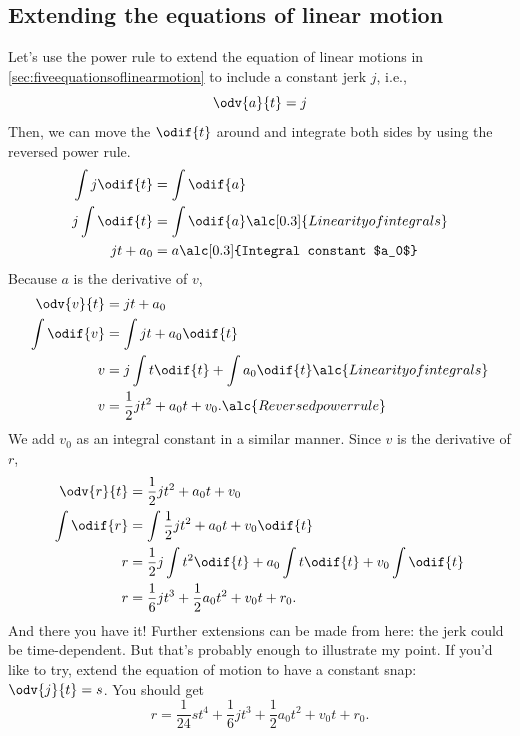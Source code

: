 \subsection{Extending the equations of linear motion}

Let's use the power rule to extend the equation of linear motions in \cref{sec:fiveequationsoflinearmotion} to include a constant jerk $j$, i.e.,
\begin{equation}
	\odv{a}{t} = j
\end{equation}
Then, we can move the $\odif{t}$ around and integrate both sides by using the reversed power rule.
\begin{align*}
	\int j\odif{t} & = \int\odif{a}                                   \\
	j\int \odif{t} & = \int\odif{a} \alc[0.3]{Linearity of integrals} \\
	jt + a_0       & = a \alc[0.3]{Integral constant $a_0$}
\end{align*}
Because $a$ is the derivative of $v$, 
\begin{align*}
	\odv{v}{t}    & = jt + a_0                                                        \\
	\int \odif{v} & = \int jt + a_0 \odif{t}                                          \\
	v             & = j\int t\odif{t} + \int a_0\odif{t} \alc{Linearity of integrals} \\
	v             & = \frac{1}{2}jt^2 + a_0t + v_0. \alc{Reversed power rule}
\end{align*}
We add $v_0$ as an integral constant in a similar manner. Since $v$ is the derivative of $r$,
\begin{align*}
	\odv{r}{t}    & = \frac{1}{2}jt^2 + a_0t + v_0                                       \\
	\int \odif{r} & = \int\frac{1}{2}jt^2 + a_0t + v_0 \odif{t}                          \\
	r             & = \frac{1}{2}j\int t^2\odif{t} + a_0\int t\odif{t} + v_0\int\odif{t} \\
	r             & = \frac{1}{6}jt^3 + \frac{1}{2}a_0t^2 + v_0t + r_0.
\end{align*}
And there you have it! Further extensions can be made from here: the jerk could be time-dependent. But that's probably enough to illustrate my point. If you'd like to try, extend the equation of motion to have a constant snap: $\odv{j}{t} = s$. You should get
\begin{equation*}
	r = \frac{1}{24}st^4 + \frac{1}{6}jt^3 + \frac{1}{2}a_0t^2 + v_0t + r_0.
\end{equation*}

